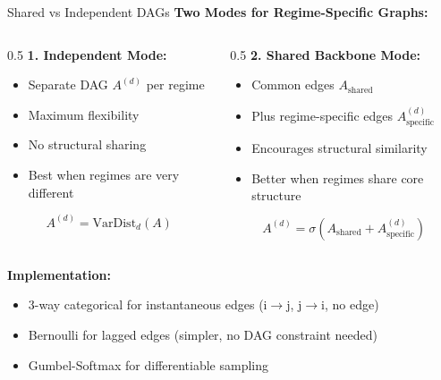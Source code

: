 \documentclass[aspectratio=169]{beamer}
\begin{document}
\begin{frame}{Shared vs Independent DAGs}
\textbf{Two Modes for Regime-Specific Graphs:}

\vspace{0.3cm}
\begin{columns}
\begin{column}{0.5\textwidth}
\textbf{1. Independent Mode:}
\begin{itemize}
    \item Separate DAG $A^{(d)}$ per regime
    \item Maximum flexibility
    \item No structural sharing
    \item Best when regimes are very different
\end{itemize}

\vspace{0.2cm}
\begin{equation*}
A^{(d)} = \text{VarDist}_d(A)
\end{equation*}
\end{column}

\begin{column}{0.5\textwidth}
\textbf{2. Shared Backbone Mode:}
\begin{itemize}
    \item Common edges $A_{\text{shared}}$
    \item Plus regime-specific edges $A^{(d)}_{\text{specific}}$
    \item Encourages structural similarity
    \item Better when regimes share core structure
\end{itemize}

\vspace{0.2cm}
\begin{equation*}
A^{(d)} = \sigma(A_{\text{shared}} + A^{(d)}_{\text{specific}})
\end{equation*}
\end{column}
\end{columns}

\vspace{0.3cm}
\textbf{Implementation:}
\begin{itemize}
    \item 3-way categorical for instantaneous edges (i$\to$j, j$\to$i, no edge)
    \item Bernoulli for lagged edges (simpler, no DAG constraint needed)
    \item Gumbel-Softmax for differentiable sampling
\end{itemize}
\end{frame}
\end{document}
